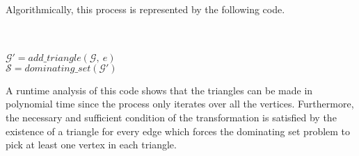\documentclass[12pt]{article}
\begin{document}
Algorithmically, this process is represented by the following code.\\
\begin{algorithm}[H]
\\
\\
{
    $\mathcal{G'}=add\_triangle(\mathcal{G},\ e)$\\
}
$\mathcal{S}=dominating\_set(\mathcal{G'})$\\
{
}
\Else
{
}
\end{algorithm}
A runtime analysis of this code shows that the triangles can be made in polynomial
time since the process only iterates over all the vertices. Furthermore, the 
necessary and sufficient condition of the transformation is satisfied by the 
existence of a triangle for every edge which forces the dominating set 
problem to pick at least one vertex in each triangle.  
\end{document}
